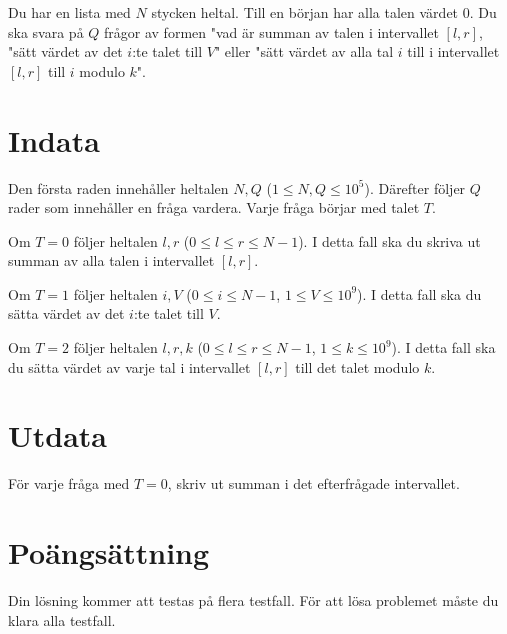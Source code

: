 Du har en lista med $N$ stycken heltal. Till en början har alla talen värdet $0$. Du ska svara på $Q$
frågor av formen "vad är summan av talen i intervallet $[l,r]$,
"sätt värdet av det $i$:te talet till $V$" eller "sätt värdet av alla tal $i$ till i intervallet $[l,r]$
till $i$ modulo $k$".

\section*{Indata}
Den första raden innehåller heltalen $N, Q$ ($1 \leq N, Q \leq 10^5$).
Därefter följer $Q$ rader som innehåller en fråga vardera. Varje fråga börjar med talet $T$.

Om $T=0$ följer heltalen $l,r$ ($0 \leq l \leq r \leq N - 1$). I detta fall ska du skriva ut summan av alla talen i intervallet $[l,r]$.

Om $T=1$ följer heltalen $i, V$ ($0 \leq i \leq N - 1$, $1 \leq V \leq 10^9$). I detta fall ska du sätta värdet av det $i$:te talet till $V$.

Om $T=2$ följer heltalen $l,r,k$ ($0 \leq l \leq r \leq N-1$, $1 \leq k \leq 10^9$). I detta fall ska du sätta värdet av varje tal i intervallet $[l,r]$ till det talet modulo $k$.

\section*{Utdata}
För varje fråga med $T=0$, skriv ut summan i det efterfrågade intervallet.

\section*{Poängsättning}
Din lösning kommer att testas på flera testfall.
\noindent
För att lösa problemet måste du klara alla testfall.
